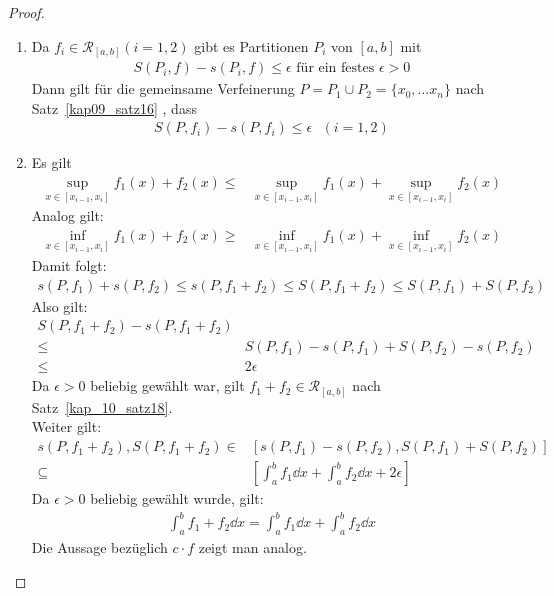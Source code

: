 \begin{proof}
	~\begin{enumerate}
		\item Da $f_i \in \mathcal{R}_{[a,b]} (i = 1, 2)$ gibt es Partitionen 
		$P_i$ von $[a,b]$ mit 
		\begin{align*}
			S(P_i,f) - s(P_i,f) \leq \epsilon \text{ für ein festes } \epsilon > 0
		\end{align*}
		Dann gilt für die gemeinsame Verfeinerung $P = P_1 \cup P_2 = \{x_0, \hdots
		x_n\}$ nach Satz~\ref{kap09_satz16}
		, dass 
		\begin{align*}
			S(P,f_i) - s(P, f_i) \leq \epsilon \text{ }(i = 1,2)
		\end{align*}		 
		\item Es gilt 
		\begin{align*}
			\sup_{x \in [x_{i-1},x_i]} f_1(x) +f_2(x) \leq & 
			\sup_{x \in [x_{i-1},x_i]} f_1(x) + \sup_{x \in [x_{i-1},x_i]} f_2(x)
		\end{align*}				
		Analog gilt: 
		\begin{align*}
			\inf_{x \in [x_{i-1},x_i]} f_1(x) + f_2(x) \geq & 
			\inf_{x \in [x_{i-1},x_i]} f_1(x) + \inf_{x \in [x_{i-1},x_i]} f_2(x)
		\end{align*}				
		Damit folgt:
		\begin{align*}
			s(P,f_1) + s(P,f_2) \leq s(P,f_1 +f_2) \leq S(P,f_1 + f_2) 
			\leq S(P,f_1) + S(P,f_2)
		\end{align*}
		Also gilt:
		\begin{align*}
			S(P, f_1 + f_2) - s(P, f_1 +f_2) & \\
			\leq &  S(P, f_1) - s(P,f_1) + S(P,f_2) 
			-s(P,f_2) \\
			 \leq & 2 \epsilon
		\end{align*}
		Da $\epsilon >0 $ beliebig gewählt war, gilt $f_1 + f_2 \in 
		\mathcal{R}_{[a,b]}$ nach Satz~\ref{kap_10_satz18}. \\
		Weiter gilt: 
		\begin{align*}
			s(P, f_1 +f_2), S(P, f_1 + f_2) \in &
			[s(P,f_1) - s(P,f_2), S(P,f_1) + S(P,f_2)] \\
			\subseteq 
			& \left[ \int_a^b f_1 \dd{x} + \int_a^b f_2\dd{x} + 2\epsilon \right]
		\end{align*}
		Da $\epsilon > 0$ beliebig gewählt wurde, gilt:
		\begin{align*}
			\int_a^b f_1 + f_2 \dd{x}  = \int_a^b f_1\dd{x} + \int_a^b f_2 \dd{x}
		\end{align*}
		Die Aussage bezüglich  $c \cdot f$ zeigt man analog.

\end{enumerate}
\end{proof}

